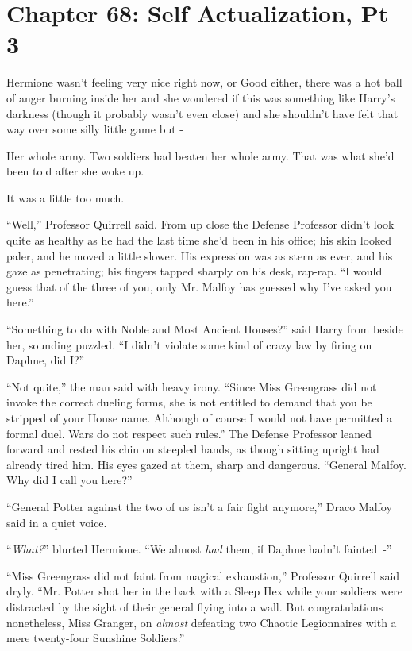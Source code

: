 \chapter{Chapter 68: Self Actualization, Pt 3}
Hermione wasn't feeling very nice right now, or Good either, there was a hot ball of anger burning inside her and she wondered if this was something like Harry's darkness (though it probably wasn't even close) and she shouldn't have felt that way over some silly little game but -

Her whole army. Two soldiers had beaten her whole army. That was what she'd been told after she woke up.

It was a little too much.

``Well,'' Professor Quirrell said. From up close the Defense Professor didn't look quite as healthy as he had the last time she'd been in his office; his skin looked paler, and he moved a little slower. His expression was as stern as ever, and his gaze as penetrating; his fingers tapped sharply on his desk, rap-rap. ``I would guess that of the three of you, only Mr. Malfoy has guessed why I've asked you here.''

``Something to do with Noble and Most Ancient Houses?'' said Harry from beside her, sounding puzzled. ``I didn't violate some kind of crazy law by firing on Daphne, did I?''

``Not quite,'' the man said with heavy irony. ``Since Miss Greengrass did not invoke the correct dueling forms, she is not entitled to demand that you be stripped of your House name. Although of course I would not have permitted a formal duel. Wars do not respect such rules.'' The Defense Professor leaned forward and rested his chin on steepled hands, as though sitting upright had already tired him. His eyes gazed at them, sharp and dangerous. ``General Malfoy. Why did I call you here?''

``General Potter against the two of us isn't a fair fight anymore,'' Draco Malfoy said in a quiet voice.

``\emph{What?}'' blurted Hermione. ``We almost \emph{had} them, if Daphne hadn't fainted~-''

``Miss Greengrass did not faint from magical exhaustion,'' Professor Quirrell said dryly. ``Mr. Potter shot her in the back with a Sleep Hex while your soldiers were distracted by the sight of their general flying into a wall. But congratulations nonetheless, Miss Granger, on \emph{almost} defeating two Chaotic Legionnaires with a mere twenty-four Sunshine Soldiers.''


